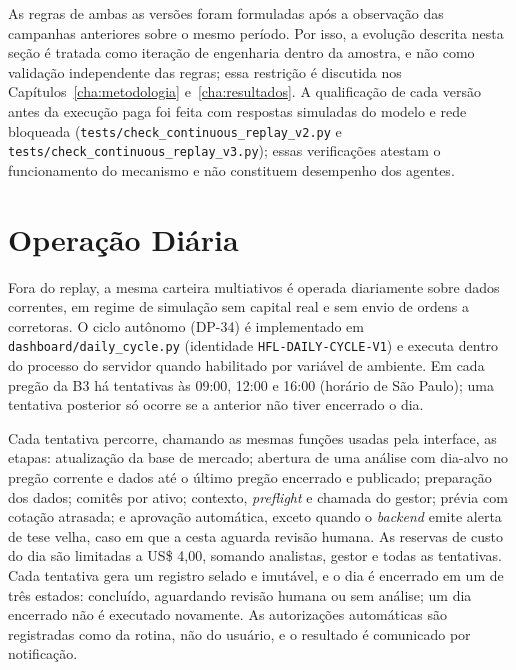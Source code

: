 \documentclass{eic-bcc-tcc}
\begin{document}
As regras de ambas as versões foram formuladas após a observação das campanhas anteriores sobre o mesmo período. Por isso, a evolução descrita nesta seção é tratada como iteração de engenharia dentro da amostra, e não como validação independente das regras; essa restrição é discutida nos Capítulos~\ref{cha:metodologia} e~\ref{cha:resultados}. A qualificação de cada versão antes da execução paga foi feita com respostas simuladas do modelo e rede bloqueada (\texttt{tests/check\_continuous\_replay\_v2.py} e \texttt{tests/check\_continuous\_replay\_v3.py}); essas verificações atestam o funcionamento do mecanismo e não constituem desempenho dos agentes.

\section{Operação Diária}
\label{sec:arq-operacao-diaria}

Fora do replay, a mesma carteira multiativos é operada diariamente sobre dados correntes, em regime de simulação sem capital real e sem envio de ordens a corretoras. O ciclo autônomo (DP-34) é implementado em \texttt{dashboard/daily\_cycle.py} (identidade \texttt{HFL-DAILY-CYCLE-V1}) e executa dentro do processo do servidor quando habilitado por variável de ambiente. Em cada pregão da B3 há tentativas às 09:00, 12:00 e 16:00 (horário de São Paulo); uma tentativa posterior só ocorre se a anterior não tiver encerrado o dia.

Cada tentativa percorre, chamando as mesmas funções usadas pela interface, as etapas: atualização da base de mercado; abertura de uma análise com dia-alvo no pregão corrente e dados até o último pregão encerrado e publicado; preparação dos dados; comitês por ativo; contexto, \textit{preflight} e chamada do gestor; prévia com cotação atrasada; e aprovação automática, exceto quando o \textit{backend} emite alerta de tese velha, caso em que a cesta aguarda revisão humana. As reservas de custo do dia são limitadas a US\$ 4,00, somando analistas, gestor e todas as tentativas. Cada tentativa gera um registro selado e imutável, e o dia é encerrado em um de três estados: concluído, aguardando revisão humana ou sem análise; um dia encerrado não é executado novamente. As autorizações automáticas são registradas como da rotina, não do usuário, e o resultado é comunicado por notificação.
\end{document}
